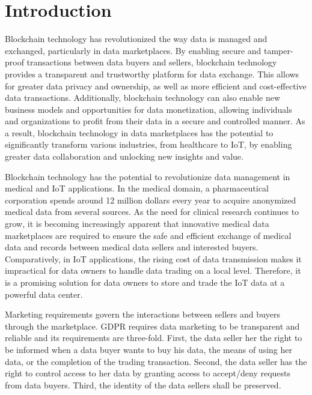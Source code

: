 \section{Introduction}
\label{sec:introduction}

Blockchain technology has revolutionized the way data is managed and exchanged, particularly in data marketplaces.
By enabling secure and tamper-proof transactions between data buyers and sellers, blockchain technology provides a transparent and trustworthy platform for data exchange.
This allows for greater data privacy and ownership, as well as more efficient and cost-effective data transactions.
Additionally, blockchain technology can also enable new business models and opportunities for data monetization, allowing individuals and organizations to profit from their data in a secure and controlled manner.
As a result, blockchain technology in data marketplaces has the potential to significantly transform various industries, from healthcare to IoT, by enabling greater data collaboration and unlocking new insights and value.

Blockchain technology has the potential to revolutionize data management in medical and IoT applications.
In the medical domain, a pharmaceutical corporation spends around 12 million dollars every year to acquire anonymized medical data from several sources.
As the need for clinical research continues to grow, it is becoming increasingly apparent that innovative medical data marketplaces are required to ensure the safe and efficient exchange of medical data and records between medical data sellers and interested buyers.
Comparatively, in IoT applications, the rising cost of data transmission makes it impractical for data owners to handle data trading on a local level.
Therefore, it is a promising solution for data owners to store
and trade the IoT data at a powerful data center.

Marketing requirements govern the interactions between sellers and buyers through the marketplace.
GDPR requires data marketing to be transparent and reliable and its requirements are three-fold.
First, the data seller her the right to be informed when a data buyer wants to buy his data, the means of using  her data, or the completion of the trading transaction.
Second, the data seller has the right to control access to her data by granting access to accept/deny requests from data buyers.
Third, the identity of the data sellers shall be preserved.

